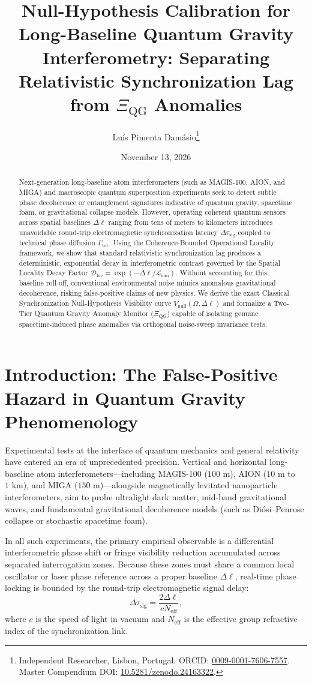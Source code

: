 \documentclass[11pt,a4paper]{article}
\title{\textbf{Null-Hypothesis Calibration for Long-Baseline Quantum Gravity Interferometry: Separating Relativistic Synchronization Lag from $\Xi_{\mathrm{QG}}$ Anomalies}}
\author{
  Lu\'{i}s {Pimenta Dam\'{a}sio}\thanks{Independent Researcher, Lisbon, Portugal. ORCID: \href{https://orcid.org/0009-0001-7606-7557}{0009-0001-7606-7557}. Master Compendium DOI: \href{https://doi.org/10.5281/zenodo.24163322}{10.5281/zenodo.24163322}.}
}
\date{November 13, 2026}
\begin{document}
\maketitle

\begin{abstract}
Next-generation long-baseline atom interferometers (such as MAGIS-100, AION, and MIGA) and macroscopic quantum superposition experiments seek to detect subtle phase decoherence or entanglement signatures indicative of quantum gravity, spacetime foam, or gravitational collapse models. However, operating coherent quantum sensors across spatial baselines $\Delta\ell$ ranging from tens of meters to kilometers introduces unavoidable round-trip electromagnetic synchronization latency $\Delta\tau_{\mathrm{sig}}$ coupled to technical phase diffusion $\Gamma_{\mathrm{tot}}$. Using the Coherence-Bounded Operational Locality framework, we show that standard relativistic synchronization lag produces a deterministic, exponential decay in interferometric contrast governed by the Spatial Locality Decay Factor $\mathcal{D}_{\mathrm{loc}} = \exp(-\Delta\ell / \mathcal{L}_{\mathrm{sim}})$. Without accounting for this baseline roll-off, conventional environmental noise mimics anomalous gravitational decoherence, risking false-positive claims of new physics. We derive the exact Classical Synchronization Null-Hypothesis Visibility curve $V_{\mathrm{null}}(\Omega, \Delta\ell)$ and formalize a Two-Tier Quantum Gravity Anomaly Monitor ($\Xi_{\mathrm{QG}}$) capable of isolating genuine spacetime-induced phase anomalies via orthogonal noise-sweep invariance tests.
\end{abstract}

\section{Introduction: The False-Positive Hazard in Quantum Gravity Phenomenology}

Experimental tests at the interface of quantum mechanics and general relativity have entered an era of unprecedented precision. Vertical and horizontal long-baseline atom interferometers---including MAGIS-100 ($100\text{ m}$), AION ($10\text{ m}$ to $1\text{ km}$), and MIGA ($150\text{ m}$)---alongside magnetically levitated nanoparticle interferometers, aim to probe ultralight dark matter, mid-band gravitational waves, and fundamental gravitational decoherence models (such as Di\'{o}si--Penrose collapse or stochastic spacetime foam).

In all such experiments, the primary empirical observable is a differential interferometric phase shift or fringe visibility reduction accumulated across separated interrogation zones. Because these zones must share a common local oscillator or laser phase reference across a proper baseline $\Delta\ell$, real-time phase locking is bounded by the round-trip electromagnetic signal delay:
\begin{equation}
\Delta\tau_{\mathrm{sig}} = \frac{2\Delta\ell}{c N_{\mathrm{eff}}},
\end{equation}
where $c$ is the speed of light in vacuum and $N_{\mathrm{eff}}$ is the effective group refractive index of the synchronization link.
\end{document}

